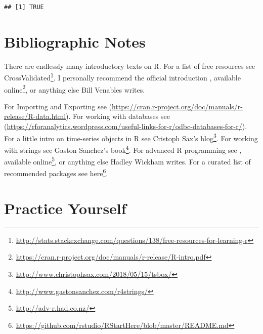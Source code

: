 \documentclass[]{book}
\renewcommand{\href}[2]{#2\footnote{\url{#1}}}
\theoremstyle{definition}
\theoremstyle{definition}
\theoremstyle{definition}
\theoremstyle{remark}
\begin{document}
\begin{verbatim}
## [1] TRUE
\end{verbatim}

\hypertarget{bibliographic-notes-1}{%
\section{Bibliographic Notes}\label{bibliographic-notes-1}}

There are endlessly many introductory texts on R.
For a list of free resources see \href{http://stats.stackexchange.com/questions/138/free-resources-for-learning-r}{CrossValidated}.
I personally recommend the official introduction \citet{venables2004introduction}, \href{https://cran.r-project.org/doc/manuals/r-release/R-intro.pdf}{available online}, or anything else Bill Venables writes.

For Importing and Exporting see (\url{https://cran.r-project.org/doc/manuals/r-release/R-data.html}).
For working with databases see (\url{https://rforanalytics.wordpress.com/useful-links-for-r/odbc-databases-for-r/}).
For a little intro on time-series objects in R see \href{http://www.christophsax.com/2018/05/15/tsbox/}{Cristoph Sax's blog}.
For working with strings see \href{http://www.gastonsanchez.com/r4strings/}{Gaston Sanchez's book}.
For advanced R programming see \citet{wickham2014advanced}, \href{http://adv-r.had.co.nz/}{available online}, or anything else Hadley Wickham writes. For a curated list of recommended packages see \href{https://github.com/rstudio/RStartHere/blob/master/README.md}{here}.

\hypertarget{practice-yourself}{%
\section{Practice Yourself}\label{practice-yourself}}
\end{document}
